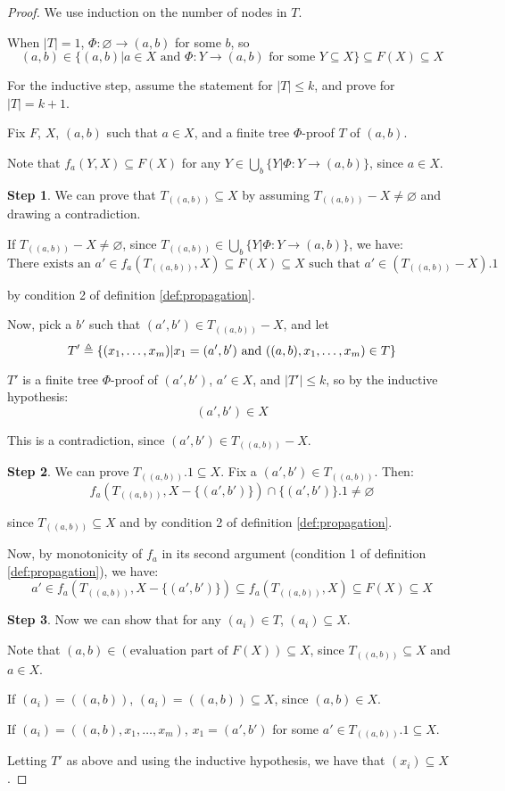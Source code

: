 \documentclass[12pt]{article}
\begin{document}
\begin{proof}
	We use induction on the number of nodes in $T$.

	When $|T|=1$, $\Phi:\varnothing\rightarrow (a,b)$ for some $b$, so
	\[(a,b)\in\{(a,b)|a\in X\text{ and }\Phi:Y\rightarrow (a,b)\text{ for some }Y\subseteq X\}\subseteq F(X)\subseteq X\]

	For the inductive step, assume the statement for $|T|\le k$, and prove for $|T|=k+1$.

	Fix $F$, $X$, $(a,b)$ such that $a\in X$, and a finite tree $\Phi$-proof $T$ of $(a,b)$.

	Note that $f_a(Y,X)\subseteq F(X)$ for any $Y\in\bigcup_{b}\{Y|\Phi:Y\rightarrow(a,b)\}$, since $a\in X$.

	\noindent\textbf{Step 1}. We can prove that $T_{((a,b))}\subseteq X$ by assuming $T_{((a,b))}-X\neq\varnothing$ and drawing a contradiction.

	If $T_{((a,b))}-X\neq\varnothing$, since $T_{((a,b))}\in\bigcup_b\{Y|\Phi:Y\rightarrow (a,b)\}$, we have:
	\[\text{There exists an }a'\in f_a(T_{((a,b))},X)\subseteq F(X)\subseteq X\text{ such that }a'\in(T_{((a,b))}-X).1\]

	by condition 2 of definition \ref{def:propagation}.

	Now, pick a $b'$ such that $(a',b')\in T_{((a,b))}-X$, and let
	\[T'\triangleq\{(x_1,\dots,x_m)|x_1=(a',b')\text{ and }((a,b),x_1,\dots,x_m)\in T\}\]

	$T'$ is a finite tree $\Phi$-proof of $(a',b')$, $a'\in X$, and $|T'|\le k$, so by the inductive hypothesis:
	\[(a',b')\in X\]

	This is a contradiction, since $(a',b')\in T_{((a,b))}-X$.

	\noindent\textbf{Step 2}. We can prove $T_{((a,b))}.1\subseteq X$. Fix a $(a',b')\in T_{((a,b))}$. Then:
	\[f_a(T_{((a,b))},X-\{(a',b')\})\cap\{(a',b')\}.1\neq\varnothing\]

	since $T_{((a,b))}\subseteq X$ and by condition 2 of definition \ref{def:propagation}.

	Now, by monotonicity of $f_a$ in its second argument (condition 1 of definition \ref{def:propagation}), we have:
	\[a'\in f_a(T_{((a,b))},X-\{(a',b')\})\subseteq f_a(T_{((a,b))},X)\subseteq F(X)\subseteq X\]

	\noindent\textbf{Step 3}. Now we can show that for any $(a_i)\in T$, $(a_i)\subseteq X$.

	Note that $(a,b)\in(\text{evaluation part of }F(X))\subseteq X$, since $T_{((a,b))}\subseteq X$ and $a\in X$.

	If $(a_i)=((a,b))$, $(a_i)=((a,b))\subseteq X$, since $(a,b)\in X$.

	If $(a_i)=((a,b),x_1,\dots,x_m)$, $x_1=(a',b')$ for some $a'\in T_{((a,b))}.1\subseteq X$.

	Letting $T'$ as above and using the inductive hypothesis, we have that $(x_i)\subseteq X$.
\end{proof}
\end{document}
